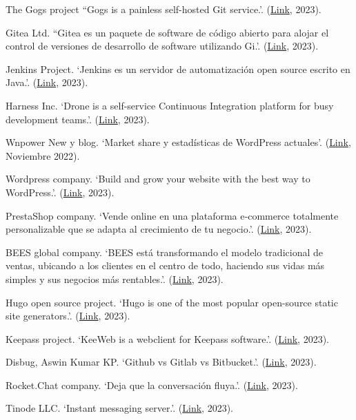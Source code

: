 \documentclass[spanish,final]{setup/eetac_tfc_pfc}
\begin{document}
\begin{thebibliography}{2}
The Gogs project 
``Gogs is a painless self-hosted Git service.'.
(\href{https://gogs.io/}{Link}, 2023).

Gitea Ltd.
``Gitea es un paquete de software de código abierto para alojar el control de versiones de desarrollo de software utilizando Gi.'.
(\href{https://about.gitea.com/}{Link}, 2023).

Jenkins Project.
`Jenkins es un servidor de automatización open source escrito en Java.'.
(\href{https://www.jenkins.io/}{Link}, 2023).

Harness Inc. 
`Drone is a self-service Continuous Integration platform for busy development teams.'.
(\href{https://www.drone.io/}{Link}, 2023).

Wnpower New y blog. 
`Market share y estadísticas de WordPress actuales'.
(\href{https://www.wnpower.com/blog/marketshare-estadisticas-wordpress/}{Link}, Noviembre 2022).

Wordpress company.
`Build and grow your website with the best way to WordPress.'.
(\href{https://wordpress.com/}{Link}, 2023).

PrestaShop company.
`Vende online en una plataforma e‑commerce totalmente personalizable que se adapta al crecimiento de tu negocio.'.
(\href{https://prestashop.es/}{Link}, 2023).

BEES global company.
`BEES está transformando el modelo tradicional de ventas, ubicando a los clientes en el centro de todo, haciendo sus vidas más simples y sus negocios más rentables.'.
(\href{https://www.bees.com/es}{Link}, 2023).

Hugo open source project.
`Hugo is one of the most popular open-source static site generators.'.
(\href{https://gohugo.io/}{Link}, 2023).

Keepass project.
`KeeWeb is a webclient for Keepass software.'.
(\href{keeweb.info}{Link}, 2023).

Disbug, Aswin Kumar KP.
`Github vs Gitlab vs Bitbucket.'.
(\href{https://disbug.io/en/blog/github-vs-gitlab-vs-bitbucket}{Link}, 2023).

Rocket.Chat company.
`Deja que la conversación fluya.'.
(\href{https://es.rocket.chat/}{Link}, 2023).

Tinode LLC.
`Instant messaging server.'.
(\href{https://github.com/tinode/chat}{Link}, 2023).


\end{thebibliography}
\end{document}
